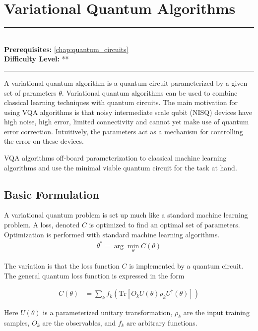 \documentclass[book.tex]{subfiles}
\begin{document}
\chapter{Variational Quantum Algorithms}
\label{chap:variation_quantum_algorithms}
\noindent\rule{11cm}{0.4pt} \\
\textbf{Prerequisites:} \autoref{chap:quantum_circuits} \\
\textbf{Difficulty Level:} ** \\
\noindent\rule{11cm}{0.4pt}
\vspace{5mm}

A variational quantum algorithm is a quantum circuit parameterized by a given set of parameters $\theta$. Variational quantum algorithms can be used to combine classical learning techniques with quantum circuits. The main motivation for using VQA algorithms is that noisy intermediate scale qubit (NISQ) devices have high noise, high error, limited connectivity and cannot yet make use of quantum error correction. Intuitively, the parameters act as a mechanism for controlling the error on these devices.

VQA algorithms off-board parameterization to classical machine learning algorithms and use the minimal viable quantum circuit for the task at hand.

\section{Basic Formulation}

A variational quantum problem is set up much like a standard machine learning problem. A loss, denoted $C$ is optimized to find an optimal set of parameters. Optimization is performed with standard machine learning algorithms.
\begin{align}
    \theta^* = \arg\min_{\theta} C(\theta)
\end{align}

The variation is that the loss function $C$ is implemented by a quantum circuit. The general quantum loss function is expressed in the form

\begin{align}
    C(\theta) &= \sum_k f_k(\mathrm{Tr}[O_kU(\theta)\rho_kU^{\dagger}(\theta)])
\end{align}

Here $U(\theta)$ is a parameterized unitary transformation, $\rho_k$ are the input training samples, $O_k$ are the observables, and $f_k$ are arbitrary functions. 
\end{document}
